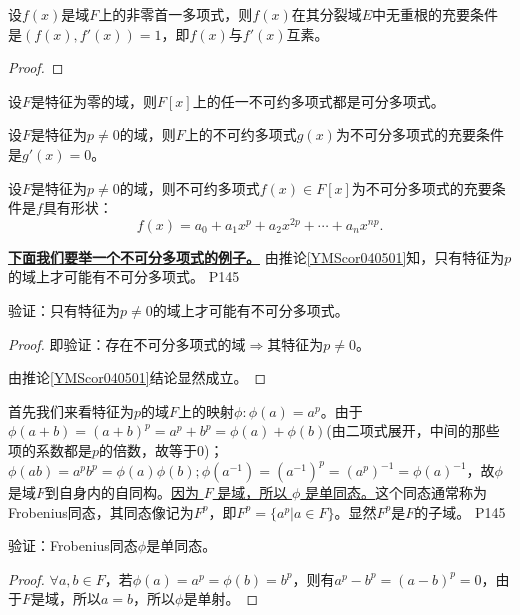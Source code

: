 \begin{theorem}
	设$f(x)$是域$F$上的非零首一多项式，则$f(x)$在其分裂域$E$中无重根的充要条件是$(f(x),f'(x))=1$，即$f(x)$与$f'(x)$互素。
\end{theorem}

\begin{proof}
	
\end{proof}


\begin{corollary}\label{YMScor040501}
	设$F$是特征为零的域，则$F[x]$上的任一不可约多项式都是可分多项式。	
\end{corollary}


\begin{corollary}
	设$F$是特征为$p\neq 0$的域，则$F$上的不可约多项式$g(x)$为不可分多项式的充要条件是$g'(x)=0$。	
\end{corollary}


\begin{corollary}
	设$F$是特征为$p\neq 0$的域，则不可约多项式$f(x)\in F[x] $为不可分多项式的充要条件是$f$具有形状：
	\begin{equation*}
		f(x)=a_{0}+a_{1}x^{p}+a_{2}x^{2p}+\cdots +a_{n}x^{np}.
	\end{equation*}
\end{corollary}
	
\original
{
	\textbf{\uline{下面我们要举一个不可分多项式的例子。} }由推论\ref{YMScor040501}知，只有特征为$p$的域上才可能有不可分多项式。
}
{P145}

\begin{proposition}
	验证：只有特征为$p\neq 0$的域上才可能有不可分多项式。
\end{proposition}

\begin{proof}
	即验证：存在不可分多项式的域$\Rightarrow$其特征为$p\neq 0 $。
	\par
	由推论\ref{YMScor040501}结论显然成立。
\end{proof}

\original
{
	首先我们来看特征为$p$的域$F$上的映射$\phi:\phi(a)=a^{p}$。由于$\phi(a+b)=(a+b)^{p}=a^{p}+b^{p}=\phi(a)+\phi(b)$(由二项式展开，中间的那些项的系数都是$p$的倍数，故等于0)；$\phi(ab)=a^{p}b^{p}=\phi(a)\phi(b);\phi(a^{-1})=(a^{-1})^{p}=(a^{p})^{-1}=\phi(a)^{-1}$，故$\phi$是域$F$到自身内的自同构。\uline{因为 $F$ 是域，所以 $\phi$ 是单同态。}这个同态通常称为Frobenius同态，其同态像记为$F^{p}$，即$F^{p}=\{a^{p}\big| a\in F\}$。显然$F^{p}$是$F$的子域。
}
{P145}

\begin{proposition}
	验证：Frobenius同态$\phi$是单同态。
\end{proposition}
\begin{proof}
	$\forall a,b\in F$，若$\phi(a)=a^{p}=\phi(b)=b^{p}$，则有$a^{p}-b^{p}=(a-b)^{p}=0$，由于$F$是域，所以$a=b$，所以$\phi$是单射。
\end{proof}

